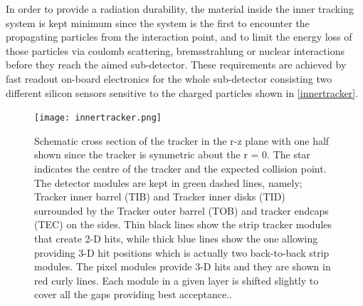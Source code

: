 In order to provide a radiation durability, the material inside the inner tracking system is kept minimum since the system is the first to encounter the propagating particles from the interaction point, and to limit the energy loss of those particles via coulomb scattering, bremsstrahlung or nuclear interactions before they reach the aimed sub-detector. These requirements are achieved by fast readout on-board electronics for the whole sub-detector consisting two different silicon sensors sensitive to the charged particles shown in \autoref{innertracker}.

\begin{figure}[ht]
	\centering
	\texttt{[image: innertracker.png]}
	\vspace{2mm}
	\caption[Schematic cross section of the tracker in the r-z plane with one half shown since the tracker is symmetric about the r = 0. The star indicates the centre of the tracker and the expected collision point. The detector modules are kept in green dashed lines, namely; Tracker inner barrel (TIB) and Tracker inner disks (TID) surrounded by the Tracker outer barrel (TOB) and tracker endcaps (TEC) on the sides. Thin black lines show the strip tracker modules that create 2-D hits, while thick blue lines show the one allowing providing 3-D hit positions which is actually two back-to-back strip modules. The pixel modules provide 3-D hits and they are shown in red curly lines. Each module in a given layer is shifted slightly cover all the gaps providing best acceptance.]{Schematic cross section of the tracker in the r-z plane with one half shown since the tracker is symmetric about the r = 0. The star indicates the centre of the tracker and the expected collision point. The detector modules are kept in green dashed lines, namely; Tracker inner barrel (TIB) and Tracker inner disks (TID) surrounded by the Tracker outer barrel (TOB) and tracker endcaps (TEC) on the sides. Thin black lines show the strip tracker modules that create 2-D hits, while thick blue lines show the one allowing providing 3-D hit positions which is actually two back-to-back strip modules. The pixel modules provide 3-D hits and they are shown in red curly lines. Each module in a given layer is shifted slightly to cover all the gaps providing best acceptance.\cite{innertracker}.}
	\label{innertracker}
\end{figure}

